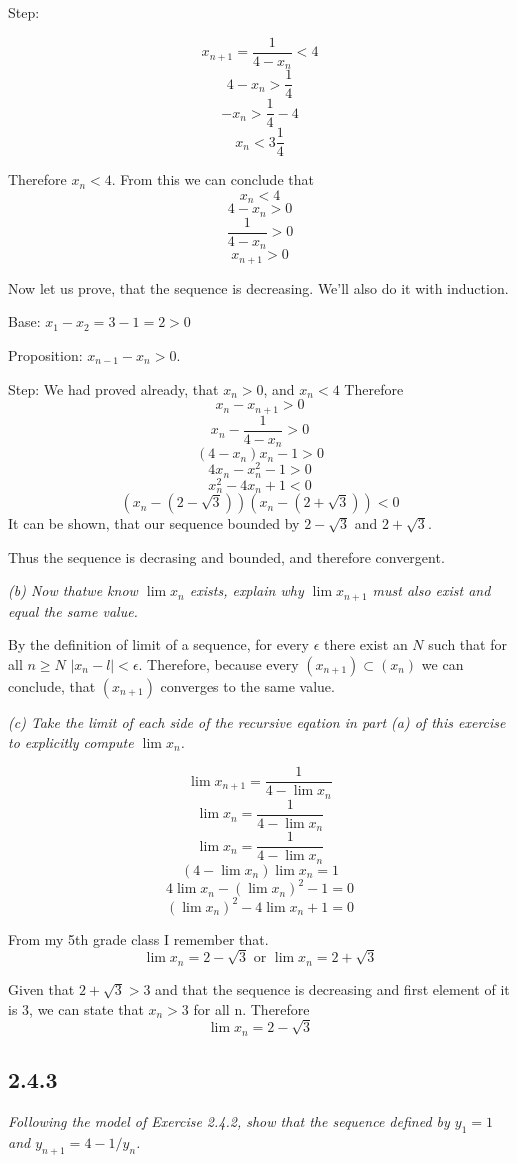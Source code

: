 \documentclass[11pt,oneside,titlepage]{book}
\begin{document}
Step:

$$x_{n + 1} = \frac{1}{4 - x_n} < 4$$
$$4 - x_n > \frac{1}{4}$$
$$- x_n > \frac{1}{4} - 4$$
$$x_n < 3\frac{1}{4}$$

Therefore $x_n < 4$. From this we can conclude that 
$$x_n < 4$$
$$4 - x_n > 0$$
$$\frac{1}{4 - x_n} > 0$$
$$x_{n + 1} > 0$$

Now let us prove, that the sequence is decreasing. We'll also do it with induction.

Base: $x_1 - x_2 = 3 - 1 = 2 > 0$

Proposition: $x_{n - 1} - x_n > 0$.

Step:
We had proved already, that $x_n > 0$, and $x_n < 4$ Therefore
$$x_n - x_{n + 1} > 0$$
$$ x_n - \frac{1}{4 - x_n} > 0$$
$$ (4 - x_n)x_n - 1 > 0$$
$$ 4 x_n - x_n^2 - 1 > 0$$
$$x_n^2 - 4 x_n + 1 < 0$$
$$(x_n - (2 - \sqrt{3}))(x_n - (2 + \sqrt{3})) < 0$$
It can be shown, that our sequence bounded by $2 - \sqrt{3}$ and $2 + \sqrt{3}$.

Thus the sequence is decrasing and bounded, and therefore convergent.

\textit{(b) Now thatwe know $\lim x_n$ exists, explain why $\lim x_{n + 1}$
  must also exist and equal the same value.}

By the definition of limit of a sequence, for every $\epsilon$ there exist an
$N$ such that for all $n \geq N$ $|x_n - l| < \epsilon$. Therefore, because
every $(x_{n + 1}) \subset (x_n)$ we can conclude, that $(x_{n + 1})$ converges
to the same value.

\textit{(c) Take the limit of each side of the recursive eqation in part (a) of
  this exercise to explicitly compute $\lim x_n$.}

$$\lim x_{n + 1} = \frac{1}{4 - \lim x_n}$$
$$\lim x_n = \frac{1}{4 - \lim x_n}$$
$$\lim x_n = \frac{1}{4 - \lim x_n}$$
$$(4 - \lim x_n)\lim x_n = 1$$
$$4 \lim x_n - (\lim x_n) ^ 2  - 1= 0$$
$$ (\lim x_n) ^ 2 - 4 \lim x_n  + 1= 0$$

From my 5th grade class I remember that.
$$\lim x_n = 2 -  \sqrt{3} \text{ or } \lim x_n = 2 +  \sqrt{3}$$

Given that $2 + \sqrt{3} > 3$ and that the sequence is decreasing and first
element of it is $3$, we can state that $x_n > 3$ for all n. Therefore
$$\lim x_n = 2 - \sqrt{3}$$

\subsection*{2.4.3}
\textit{Following the model of Exercise 2.4.2, show that the sequence defined
  by $y_1 = 1$ and $y_{n + 1} = 4 - 1/y_n$.}
\end{document}
